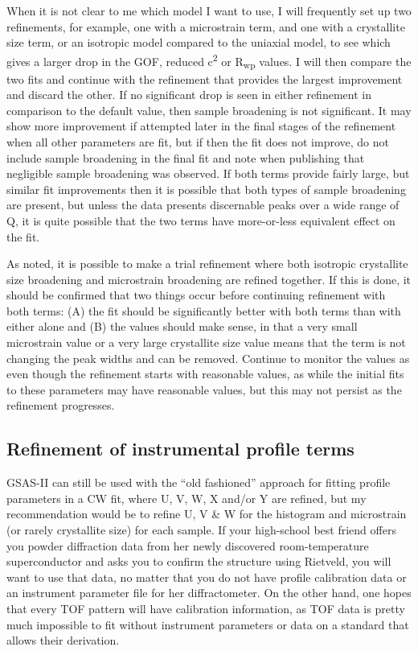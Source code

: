  When it is not clear to me which model I want to use, I will frequently set up two refinements, for example, one with a microstrain term, and one with a crystallite size term, or an isotropic model compared to the uniaxial model, to see which gives a larger drop in the GOF, reduced c\textsuperscript{2} or R\textsubscript{wp} values. I will then compare the two fits and continue with the refinement that provides the largest improvement and discard the other. If no significant drop is seen in either refinement in comparison to the default value, then sample broadening is not significant. It may show more improvement if attempted later in the final stages of the refinement when all other parameters are fit, but if then the fit does not improve, do not include sample broadening in the final fit and note when publishing that negligible sample broadening was observed. If both terms provide fairly large, but similar fit improvements then it is possible that both types of sample broadening are present, but unless the data presents discernable peaks over a wide range of Q, it is quite possible that the two terms have more-or-less equivalent effect on the fit. 

 As noted, it is possible to make a trial refinement where both isotropic crystallite size broadening and microstrain broadening are refined together. If this is done, it should be confirmed that two things occur before continuing refinement with both terms: (A) the fit should be significantly better with both terms than with either alone and (B) the values should make sense, in that a very small microstrain value or a very large crystallite size value means that the term is not changing the peak widths and can be removed. Continue to monitor the values as even though the refinement starts with reasonable values, as while the initial fits to these parameters may have reasonable values, but this may not persist as the refinement progresses. 

 

\subsection{Refinement of instrumental profile terms}

GSAS-II can still be used with the “old fashioned” approach for fitting profile parameters in a CW fit, where U, V, W, X and/or Y are refined, but my recommendation would be to refine U, V \& W for the histogram and microstrain (or rarely crystallite size) for each sample. If your high-school best friend offers you powder diffraction data from her newly discovered room-temperature superconductor and asks you to confirm the structure using Rietveld, you will want to use that data, no matter that you do not have profile calibration data or an instrument parameter file for her diffractometer. On the other hand, one hopes that every TOF pattern will have calibration information, as TOF data is pretty much impossible to fit without instrument parameters or data on a standard that allows their derivation. 

